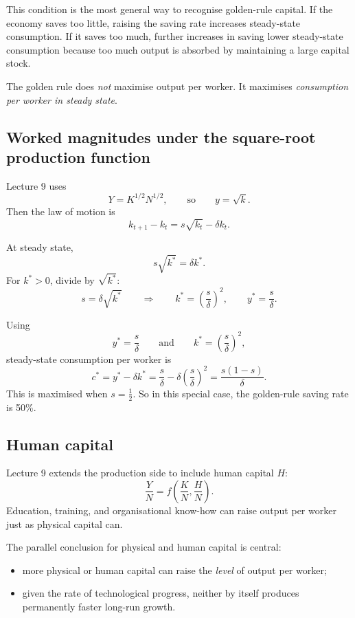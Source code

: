 \documentclass[12pt]{article}
\begin{document}
\noindent
This condition is the most general way to recognise golden-rule capital. If the economy saves too little, raising the saving rate increases steady-state consumption. If it saves too much, further increases in saving lower steady-state consumption because too much output is absorbed by maintaining a large capital stock.

\begin{commonmistake}
The golden rule does \emph{not} maximise output per worker. It maximises \emph{consumption per worker in steady state}.
\end{commonmistake}

\subsection{Worked magnitudes under the square-root production function}

Lecture 9 uses
\[
Y=K^{1/2}N^{1/2},
\qquad\text{so}\qquad
y=\sqrt{k}.
\]
Then the law of motion is
\[
k_{t+1}-k_t=s\sqrt{k_t}-\delta k_t.
\]

At steady state,
\[
s\sqrt{k^*}=\delta k^*.
\]
For \(k^*>0\), divide by \(\sqrt{k^*}\):
\[
s=\delta\sqrt{k^*}
\qquad\Rightarrow\qquad
k^*=\left(\frac{s}{\delta}\right)^2,
\qquad
y^*=\frac{s}{\delta}.
\]

\begin{examplebox}[title={Worked Example: Consumption and the golden rule in the square-root case}]
Using
\[
y^*=\frac{s}{\delta}
\qquad\text{and}\qquad
k^*=\left(\frac{s}{\delta}\right)^2,
\]
steady-state consumption per worker is
\[
c^*=y^*-\delta k^*
=\frac{s}{\delta}-\delta\left(\frac{s}{\delta}\right)^2
=\frac{s(1-s)}{\delta}.
\]
This is maximised when \(s=\tfrac12\). So in this special case, the golden-rule saving rate is 50\%.
\end{examplebox}

\subsection{Human capital}

Lecture 9 extends the production side to include human capital \(H\):
\[
\frac{Y}{N}=f\!\left(\frac{K}{N},\frac{H}{N}\right).
\]
Education, training, and organisational know-how can raise output per worker just as physical capital can.

\begin{policynote}
The parallel conclusion for physical and human capital is central:
\begin{itemize}[leftmargin=1.5em]
\item more physical or human capital can raise the \emph{level} of output per worker;
\item given the rate of technological progress, neither by itself produces permanently faster long-run growth.
\end{itemize}
\end{policynote}
\end{document}
